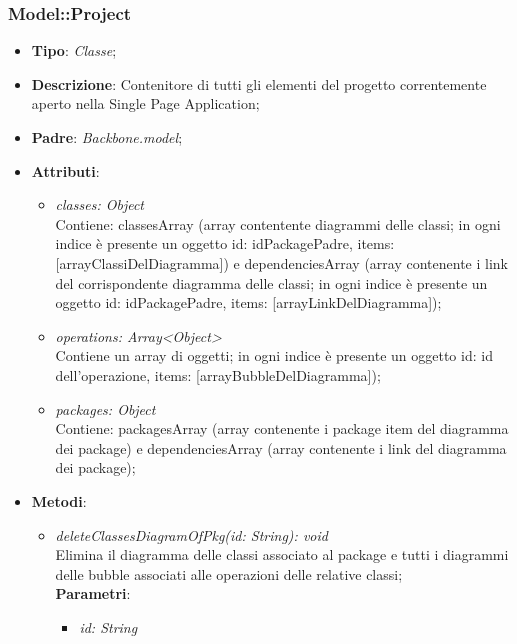 \documentclass[../DefinizioneDiProdotto.tex]{subfiles}
\begin{document}
				\subsubsection{Model::Project}
				\hypertarget{SWEDesigner::Client::Model::Project}{}
					\begin{itemize}
						\item \textbf{Tipo}: \emph{Classe};
						\item \textbf{Descrizione}: Contenitore di tutti gli elementi del progetto correntemente aperto nella Single Page Application;
						\item \textbf{Padre}: \emph{Backbone.model};
						\item \textbf{Attributi}:
						\begin{itemize}
							\item \emph{classes: Object} \\
							Contiene: classesArray (array contentente diagrammi delle classi; in ogni indice è presente un oggetto {id: idPackagePadre, items: [arrayClassiDelDiagramma]}) e dependenciesArray (array contenente i link del corrispondente diagramma delle classi; in ogni indice è presente un oggetto {id: idPackagePadre, items: [arrayLinkDelDiagramma]}); \\
							\item \emph{operations: Array<Object>} \\
							Contiene un array di oggetti; in ogni indice è presente un oggetto {id: id dell'operazione, items: [arrayBubbleDelDiagramma]}); \\
							\item \emph{packages: Object} \\
							Contiene: packagesArray (array contenente i package item del diagramma dei package) e dependenciesArray (array contenente i link del diagramma dei package); \\
						\end{itemize}
						\item \textbf{Metodi}:
						\begin{itemize}
							\item \emph{deleteClassesDiagramOfPkg(id: String): void} \\
							Elimina il diagramma delle classi associato al package e tutti i diagrammi delle bubble associati alle operazioni delle relative classi; \\
							\textbf{Parametri}:
							\begin{itemize}
								\item \emph{id: String}

\end{itemize}
\end{itemize}
\end{itemize}
\end{document}
